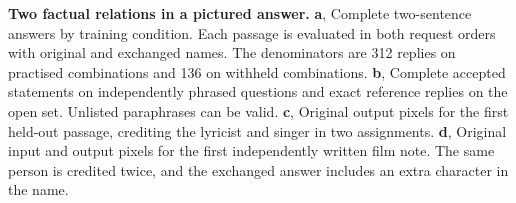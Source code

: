 \textbf{Two factual relations in a pictured answer.}
\textbf{a}, Complete two-sentence answers by training condition. Each passage is evaluated in both request orders with original and exchanged names. The denominators are 312 replies on practised combinations and 136 on withheld combinations.
\textbf{b}, Complete accepted statements on independently phrased questions and exact reference replies on the open set. Unlisted paraphrases can be valid.
\textbf{c}, Original output pixels for the first held-out passage, crediting the lyricist and singer in two assignments.
\textbf{d}, Original input and output pixels for the first independently written film note. The same person is credited twice, and the exchanged answer includes an extra character in the name.
